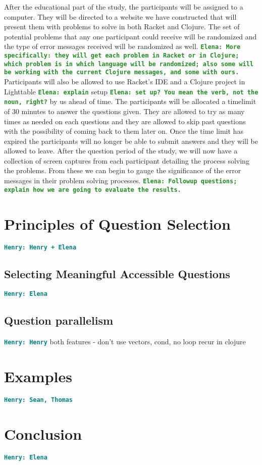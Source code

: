 \documentclass[12pt]{article}
\newcommand{\comment}[1]{{\bf \tt  {#1}}}
\newcommand{\emcomment}[1]{\textcolor{ForestGreen}{\comment{Elena: {#1}}}}
\newcommand{\hfcomment}[1]{\textcolor{Teal}{\comment{Henry: {#1}}}}
\begin{document}
	After the educational part of the study, the participants will be assigned to a computer. They will be directed to a website we have constructed that will present them with problems to solve in both Racket and Clojure. The set of potential problems that any one participant could receive will be randomized and the type of error messages received will be randomized as well. \emcomment{More specifically: they will get each problem in Racket or in Clojure; which problem is in which language will be randomized; also some will be working with the current Clojure messages, and some with ours.}
Participants will also be allowed to use Racket's IDE and a Clojure project in Lighttable \emcomment{explain}  setup \emcomment{set up? You mean the verb, not the noun, right?} by us ahead of time. The participants will be allocated a timelimit of 30 minutes to answer the questions given. They are allowed to try as many times as needed on each questions and they are allowed to skip past questions with the possibility of coming back to them later on. Once the time limit has expired the participants will no longer be able to submit answers and they will be allowed to leave. After the question period of the study, we will now have a collection of screen captures from each participant detailing the process solving the problems. From these we can begin to gauge the significance of the error messages in their problem solving processes. 
\emcomment{Followup questions; explain how we are going to evaluate the results.}

	
	

\section{Principles of Question Selection}\label{sec:select}
	\hfcomment{Henry + Elena}
	\subsection{Selecting Meaningful Accessible Questions}\label{sec:meaning}
	\hfcomment{Elena}
	\subsection{Question parallelism}\label{sec:parallel}
	\hfcomment{Henry}
	both features - don't use vectors, cond, no loop recur in clojure
\section{Examples}\label{sec:examples}
	\hfcomment{Sean, Thomas}

\section{Conclusion}\label{sec:conclusion}
	\hfcomment{Elena}




\end{document}
